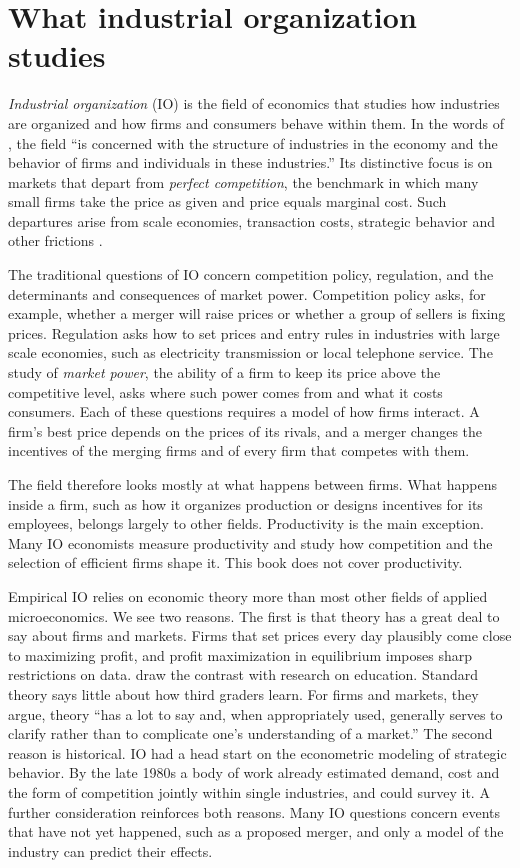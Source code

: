 \section{What industrial organization studies}\label{sec:01-what-is-io}

\emph{Industrial organization} (IO) is the field of economics that studies how industries are organized and
how firms and consumers behave within them. In the words of \citet[p.~146]{EinavLevin2010}, the field ``is
concerned with the structure of industries in the economy and the behavior of firms and individuals in these
industries.'' Its distinctive focus is on markets that depart from \emph{perfect competition}, the benchmark
in which many small firms take the price as given and price equals marginal cost. Such departures arise from
scale economies, transaction costs, strategic behavior and other frictions \citep[p.~146]{EinavLevin2010}.

The traditional questions of IO concern competition policy, regulation, and the determinants and consequences
of market power. Competition policy asks, for example, whether a merger will raise prices or whether a group of
sellers is fixing prices. Regulation asks how to set prices and entry rules in industries with large scale
economies, such as electricity transmission or local telephone service. The study of \emph{market power}, the
ability of a firm to keep its price above the competitive level, asks where such power comes from and what it
costs consumers. Each of these questions requires a model of how firms interact. A firm's best price depends on
the prices of its rivals, and a merger changes the incentives of the merging firms and of every firm that
competes with them.

The field therefore looks mostly at what happens between firms. What happens inside a firm, such as how it
organizes production or designs incentives for its employees, belongs largely to other fields. Productivity is
the main exception. Many IO economists measure productivity and study how competition and the selection of
efficient firms shape it. This book does not cover productivity.

Empirical IO relies on economic theory more than most other fields of applied microeconomics. We see two
reasons. The first is that theory has a great deal to say about firms and markets. Firms that set prices every
day plausibly come close to maximizing profit, and profit maximization in equilibrium imposes sharp
restrictions on data. \citet[pp.~158--159]{EinavLevin2010} draw the contrast with research on education.
Standard theory says little about how third graders learn. For firms and markets, they argue, theory ``has a
lot to say and, when appropriately used, generally serves to clarify rather than to complicate one's
understanding of a market.'' The second reason is historical. IO had a head start on the econometric modeling
of strategic behavior. By the late 1980s a body of work already estimated demand, cost and the form of
competition jointly within single industries, and \citet{Bresnahan1989} could survey it. A further
consideration reinforces both reasons. Many IO questions concern events that have not yet happened, such as a
proposed merger, and only a model of the industry can predict their effects.

